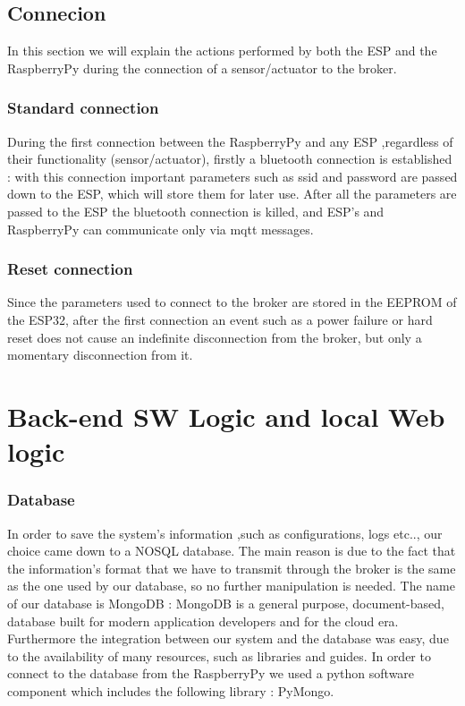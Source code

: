 \documentclass[a4paper]{article}
\begin{document}
        \subsection{Connecion}
        In this section we will explain the actions performed by both the ESP and the RaspberryPy during the connection of a sensor/actuator to the broker.
        
        \subsubsection{Standard connection}
        During the first connection between the RaspberryPy and any ESP ,regardless of their functionality (sensor/actuator), firstly a bluetooth connection is established : with this connection important parameters such as ssid and password are passed down to the ESP, which will store them for later use. After all the parameters are passed to the ESP the bluetooth connection is killed, and ESP's and RaspberryPy can communicate only via mqtt messages.
        
        \subsubsection{Reset connection}
        Since the parameters used to connect to the broker are stored in the EEPROM of the ESP32, after the first connection an event such as a power failure or hard reset does not cause an indefinite disconnection from the broker, but only a momentary disconnection from it.

    \section{Back-end SW Logic and local Web logic}
    
        \subsubsection{Database}
        In order to save the system's information ,such as configurations, logs etc.., our choice came down to a NOSQL database. The main reason is due to the fact that the information's format that we have to transmit through the broker is the same as the one used by our database, so no further manipulation is needed. The name of our database is MongoDB : MongoDB is a general purpose, document-based, database built for modern application developers and for the cloud era. Furthermore the integration between our system and the database was easy, due to the availability of many resources, such as libraries and guides. In order to connect to the database from the RaspberryPy we used a python software component which includes the following library : PyMongo.
        
\end{document}
